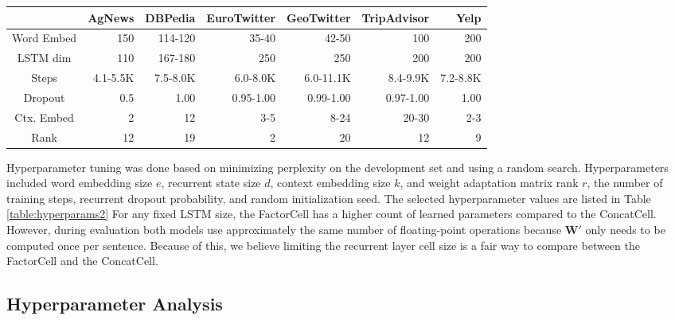 \begin{table*}[]
\centering
\begin{tabular}{crrrrrr}
\textbf{}  & \textbf{AgNews} & \textbf{DBPedia} & \textbf{EuroTwitter} & \textbf{GeoTwitter} & \textbf{TripAdvisor} & \textbf{Yelp} \\ \hline
Word Embed & 150      & 114-120  & 35-40       & 42-50      & 100         & 200      \\
LSTM dim   & 110      & 167-180  & 250         & 250        & 200         & 200      \\
Steps      & 4.1-5.5K & 7.5-8.0K & 6.0-8.0K    & 6.0-11.1K  & 8.4-9.9K    & 7.2-8.8K \\
Dropout    & 0.5      & 1.00 & 0.95-1.00   & 0.99-1.00      & 0.97-1.00   & 1.00     \\
Ctx. Embed & 2        & 12      & 3-5         & 8-24       & 20-30       & 2-3      \\
Rank       & 12       & 19        & 2           & 20         & 12          & 9       
\end{tabular}
\caption{Selected hyperparameters for each dataset. When a range is listed it means that a different values were selected for the FactorCell, ConcatCell, SoftmaxBias or Unadapted models.}
\label{table:hyperparams2}
\end{table*}

Hyperparameter tuning was done based on minimizing perplexity on the development set and using a random search. 
Hyperparameters included word embedding size $e$, recurrent state size $d$, context embedding size $k$, and weight adaptation matrix rank $r$, the number of training steps, recurrent dropout probability, and random initialization seed. The selected hyperparameter values are listed in Table \ref{table:hyperparams2}
For any fixed LSTM size, the FactorCell has a higher count of learned parameters compared to the ConcatCell. However, during evaluation both models use approximately the same number of floating-point operations because $\mathbf{W}'$ only needs to be computed once per sentence. Because of this, we believe limiting the recurrent layer cell size is a fair way to compare between the FactorCell and the ConcatCell.





\subsection{Hyperparameter Analysis}
\label{sec:hyperparam_analysis}

